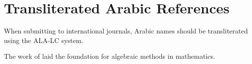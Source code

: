 \documentclass[12pt, a4paper]{article}
\begin{document}
\section{Transliterated Arabic References}

When submitting to international journals, Arabic names should be
transliterated using the ALA-LC system.

The work of \textcite{khwarizmi1983} laid the foundation for
algebraic methods in mathematics.

\printbibliography
\end{document}
